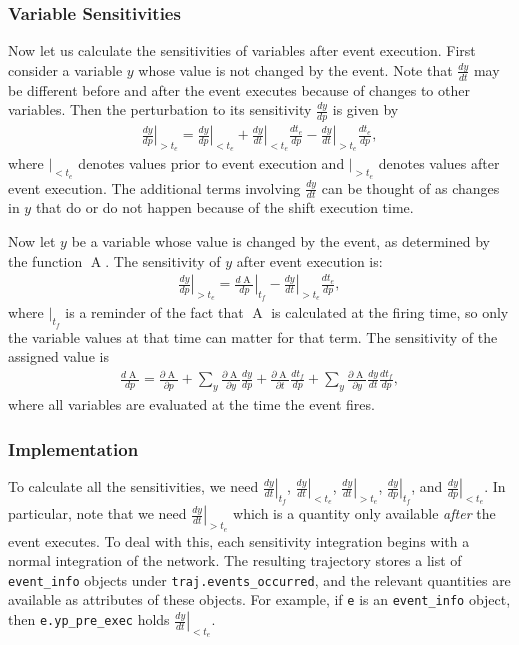 \documentclass[12pt]{article}
\makeatletter
\newcommand{\py}[1]{\lstinline[language=Python, showstringspaces=False]@#1@}
\newcommand{\assignment}{\ensuremath{\operatorname{A}}\xspace}
\makeatother
\begin{document}
\subsubsection{Variable Sensitivities}
Now let us calculate the sensitivities of variables after event execution.
First consider a variable $y$ whose value is not changed by the event.
Note that $\frac{dy}{dt}$ may be different before and after the event executes because of changes to other variables.
Then the perturbation to its sensitivity $\frac{dy}{dp}$ is given by
\begin{align}
\left.\frac{dy}{dp}\right|_{> t_e} = \left.\frac{dy}{dp}\right|_{< t_e} + \left.\frac{dy}{dt}\right|_{< t_e} \frac{d t_e}{dp} - \left.\frac{dy}{dt}\right|_{> t_e} \frac{d t_e}{dp},
\end{align}
where $|_{< t_e}$ denotes values prior to event execution and $|_{> t_e}$ denotes values after event execution. 
The additional terms involving $\frac{dy}{dt}$ can be thought of as changes in $y$ that do or do not happen because of the shift execution time.

Now let $y$ be a variable whose value is changed by the event, as determined by the function \assignment.
The sensitivity of $y$ after event execution is:
\begin{align}
\left.\frac{dy}{dp}\right|_{> t_e} =
 \left.\frac{d \assignment}{dp}\right|_{t_f} 
 - \left.\frac{dy}{dt}\right|_{> t_e} \frac{d t_e}{dp},
\end{align}
where $|_{t_f}$ is a reminder of the fact that \assignment is calculated at the firing time, so only the variable values at that time can matter for that term.
The sensitivity of the assigned value is
\begin{align}
\frac{d \assignment}{dp} = 
\frac{\partial \assignment}{\partial p} 
+ \sum_y \frac{\partial \assignment}{\partial y} \frac{dy}{dp} 
+ \frac{\partial \assignment}{\partial t} \frac{d t_f}{dp} 
+ \sum_y \frac{\partial \assignment}{\partial y} \frac{dy}{dt}\frac{d t_f}{dp},
\end{align}
where all variables are evaluated at the time the event fires.

\subsubsection{Implementation}
To calculate all the sensitivities, we need $\left.\frac{dy}{dt}\right|_{t_f}$, $\left.\frac{dy}{dt}\right|_{< t_e}$, $\left.\frac{dy}{dt}\right|_{> t_e}$, $\left.\frac{dy}{dp}\right|_{t_f}$, and $\left.\frac{dy}{dp}\right|_{< t_e}$.
In particular, note that we need $\left.\frac{dy}{dt}\right|_{> t_e}$ which is a quantity only available \emph{after} the event executes.
To deal with this, each sensitivity integration begins with a normal integration of the network.
The resulting trajectory stores a list of \py{event_info} objects under \py{traj.events_occurred}, and the relevant quantities are available as attributes of these objects.
For example, if \py{e} is an \py{event_info} object, then \py{e.yp_pre_exec} holds $\left.\frac{dy}{dt}\right|_{< t_e}$.
\end{document}
